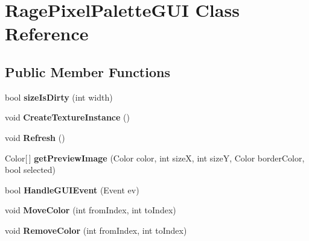 \hypertarget{class_rage_pixel_palette_g_u_i}{\section{Rage\-Pixel\-Palette\-G\-U\-I Class Reference}
\label{class_rage_pixel_palette_g_u_i}
}
\subsection*{Public Member Functions}
\begin{DoxyCompactItemize}
\item 
\hypertarget{class_rage_pixel_palette_g_u_i_aa772405ac36b555504bad63006362ab5}{bool {\bfseries size\-Is\-Dirty} (int width)}\label{class_rage_pixel_palette_g_u_i_aa772405ac36b555504bad63006362ab5}

\item 
\hypertarget{class_rage_pixel_palette_g_u_i_a504df75701c92a8a53010174e7d38d22}{void {\bfseries Create\-Texture\-Instance} ()}\label{class_rage_pixel_palette_g_u_i_a504df75701c92a8a53010174e7d38d22}

\item 
\hypertarget{class_rage_pixel_palette_g_u_i_a43a24c026593a2df508c8bd76c992e59}{void {\bfseries Refresh} ()}\label{class_rage_pixel_palette_g_u_i_a43a24c026593a2df508c8bd76c992e59}

\item 
\hypertarget{class_rage_pixel_palette_g_u_i_a33af233c7792762f72b8398deaf57b64}{Color\mbox{[}$\,$\mbox{]} {\bfseries get\-Preview\-Image} (Color color, int size\-X, int size\-Y, Color border\-Color, bool selected)}\label{class_rage_pixel_palette_g_u_i_a33af233c7792762f72b8398deaf57b64}

\item 
\hypertarget{class_rage_pixel_palette_g_u_i_aab93b97a8084ab1d6d917482c66dddae}{bool {\bfseries Handle\-G\-U\-I\-Event} (Event ev)}\label{class_rage_pixel_palette_g_u_i_aab93b97a8084ab1d6d917482c66dddae}

\item 
\hypertarget{class_rage_pixel_palette_g_u_i_ac7442b782b6cf6bc3db286abc0832ce5}{void {\bfseries Move\-Color} (int from\-Index, int to\-Index)}\label{class_rage_pixel_palette_g_u_i_ac7442b782b6cf6bc3db286abc0832ce5}

\item 
\hypertarget{class_rage_pixel_palette_g_u_i_a3fcb4a679e11b97f2d0a2e5a6f78fa19}{void {\bfseries Remove\-Color} (int from\-Index, int to\-Index)}\label{class_rage_pixel_palette_g_u_i_a3fcb4a679e11b97f2d0a2e5a6f78fa19}


\end{DoxyCompactItemize}
